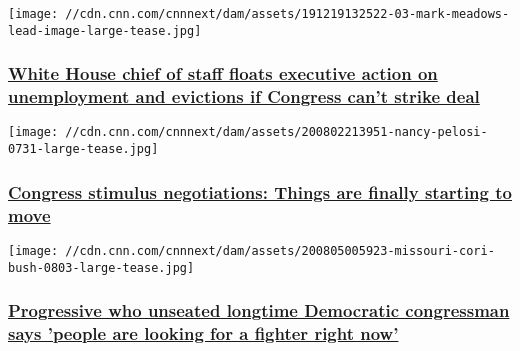 \href{/2020/08/05/politics/mark-meadows-unemployment-benefits-extension-coronavirus-relief-cnntv/index.html}{}

\texttt{[image: //cdn.cnn.com/cnnnext/dam/assets/191219132522-03-mark-meadows-lead-image-large-tease.jpg]}

\hypertarget{white-house-chief-of-staff-floats-executive-action-on-unemployment-and-evictions-if-congress-cant-strike-deal}{%
\subsubsection{\texorpdfstring{\href{/2020/08/05/politics/mark-meadows-unemployment-benefits-extension-coronavirus-relief-cnntv/index.html}{White
House chief of staff floats executive action on unemployment and
evictions if Congress can't strike
deal}}{White House chief of staff floats executive action on unemployment and evictions if Congress can't strike deal}}\label{white-house-chief-of-staff-floats-executive-action-on-unemployment-and-evictions-if-congress-cant-strike-deal}}

\href{/2020/08/05/politics/congress-stimulus-negotiations/index.html}{}

\texttt{[image: //cdn.cnn.com/cnnnext/dam/assets/200802213951-nancy-pelosi-0731-large-tease.jpg]}

\hypertarget{congress-stimulus-negotiations-things-are-finally-starting-to-move}{%
\subsubsection{\texorpdfstring{\href{/2020/08/05/politics/congress-stimulus-negotiations/index.html}{Congress
stimulus negotiations: Things are finally starting to
move}}{Congress stimulus negotiations: Things are finally starting to move}}\label{congress-stimulus-negotiations-things-are-finally-starting-to-move}}

\href{/2020/08/05/politics/cori-bush-william-lacy-clay-cnntv/index.html}{}

\texttt{[image: //cdn.cnn.com/cnnnext/dam/assets/200805005923-missouri-cori-bush-0803-large-tease.jpg]}

\hypertarget{progressive-who-unseated-longtime-democratic-congressman-says-people-are-looking-for-a-fighter-right-now}{%
\subsubsection{\texorpdfstring{\href{/2020/08/05/politics/cori-bush-william-lacy-clay-cnntv/index.html}{Progressive
who unseated longtime Democratic congressman says 'people are looking
for a fighter right
now'}}{Progressive who unseated longtime Democratic congressman says 'people are looking for a fighter right now'}}\label{progressive-who-unseated-longtime-democratic-congressman-says-people-are-looking-for-a-fighter-right-now}}

